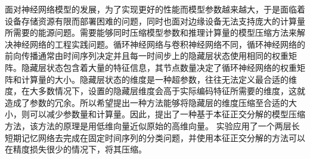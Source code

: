 面对神经网络模型的发展，为了实现更好的性能而模型参数越来越大，于是面临着设备存储资源有限而部署困难的问题\cite{deng2020model}，同时也面对边缘设备无法支持庞大的计算量所需要的能源问题\cite{han2015deep}。需要能够同时压缩模型参数和推理计算量的模型压缩方法来解决神经网络的工程实践问题。循环神经网络与卷积神经网络不同，循环神经网络的前向传播通常由时间序列决定并且每一时间步上的隐藏层状态使用相同的权重矩阵。隐藏层状态包含着大量的特征信息，其节点数量决定了循环神经网络的权重矩阵和计算量的大小。隐藏层状态的维度是一种超参数，往往无法定义最合适的维度，在大多数情况下，设置的隐藏层维度会高于实际编码特征所需要的维度，这就造成了参数的冗余。所以希望提出一种方法能够将隐藏层的维度压缩至合适的大小，则可以减少参数量和计算量。因此，提出了一种基于本征正交分解的模型压缩方法，该方法的原理是用低维向量近似原始的高维向量。
实验应用了一个两层长短期记忆网络去完成在固定时间序列的分类问题，并使用本征正交分解的方法可以在精度损失很少的情况下，将其压缩。




